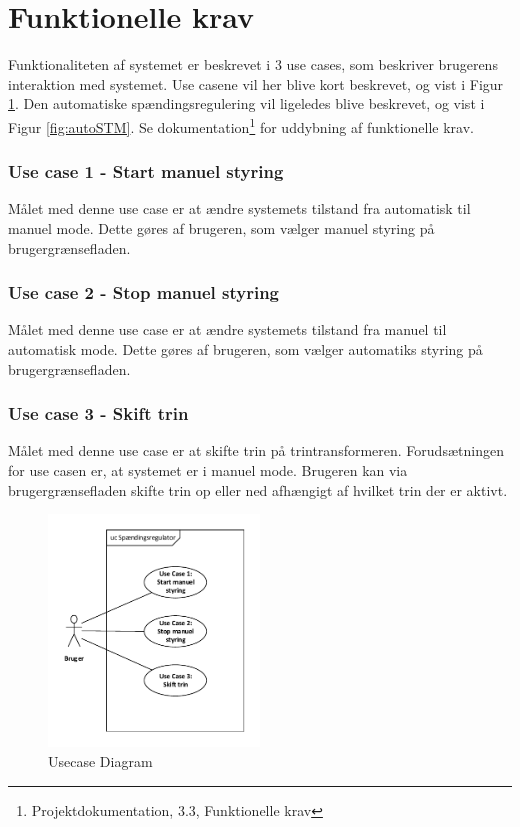 
\section{Funktionelle krav}

Funktionaliteten af systemet er beskrevet i 3 use cases, som beskriver brugerens interaktion med systemet. Use casene vil her blive kort beskrevet, og vist i Figur \ref{fig:UsecaseDiagram}.
 Den automatiske spændingsregulering vil ligeledes blive beskrevet, og vist i Figur \ref{fig:autoSTM}.
  Se dokumentation\footnote{Projektdokumentation, 3.3, Funktionelle krav} for uddybning af funktionelle krav. 

\subsubsection{Use case 1 - Start manuel styring}
Målet med denne use case er at ændre systemets tilstand fra automatisk til manuel mode. Dette gøres af brugeren, som vælger manuel styring på brugergrænsefladen. 

\subsubsection{Use case 2 - Stop manuel styring}
Målet med denne use case er at ændre systemets tilstand fra manuel til automatisk mode. Dette gøres af brugeren, som vælger automatiks styring på brugergrænsefladen. 

\subsubsection{Use case 3 - Skift trin}
Målet med denne use case er at skifte trin på trintransformeren. Forudsætningen for use casen er, at systemet er i manuel mode. Brugeren kan via brugergrænsefladen skifte trin op eller ned afhængigt af hvilket trin der er aktivt. 

\begin{figure}[H] %
	\centering
	\includegraphics[width=0.5\textwidth]{figure/UsecaseDiagram}
	\caption{Usecase Diagram}
	\label{fig:UsecaseDiagram}
\end{figure}

